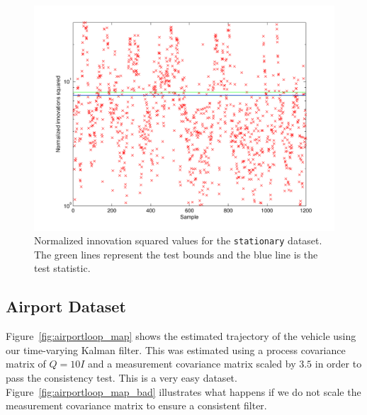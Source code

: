 \begin{figure}
\includegraphics[width=\columnwidth]{nis_stationary}
\caption{Normalized innovation squared values for the \texttt{stationary} dataset.  The green lines represent the test bounds and the blue line is the test statistic.}
\label{fig:nis_stationary}
\end{figure}



\subsection{Airport Dataset}
Figure~\ref{fig:airportloop_map} shows the estimated trajectory of the vehicle using our time-varying Kalman filter.  This was estimated using a process covariance matrix of $Q = 10I$ and a measurement covariance matrix scaled by $3.5$ in order to pass the consistency test.  This is a very easy dataset.  Figure~\ref{fig:airportloop_map_bad} illustrates what happens if we do not scale the measurement covariance matrix to ensure a consistent filter.

